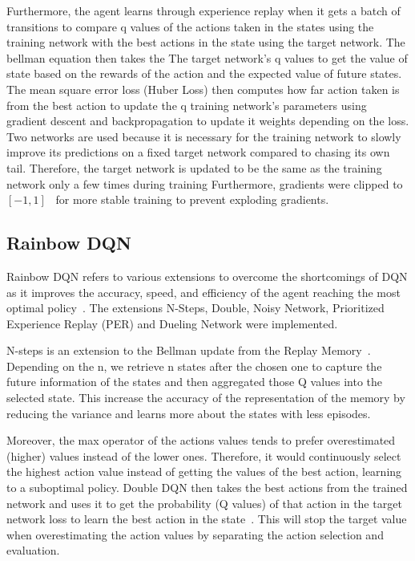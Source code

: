 \documentclass{article}
\begin{document}
Furthermore, the agent learns through experience replay when it gets a batch of transitions to compare q values of the actions taken in the states using the training network with the best actions in the state using the target network.
The bellman equation then takes the The target network's q values to get the value of state based on the rewards of the action and the expected value of future states.
The mean square error loss (Huber Loss) then computes how far action taken is from the best action to update the q training network's parameters using gradient descent and backpropagation to update it weights depending on the loss.
Two networks are used because it is necessary for the training network to slowly improve its predictions on a fixed target network compared to chasing its own tail.
Therefore, the target network is updated to be the same as the training network only a few times during training
Furthermore, gradients were clipped to \([-1,1]\)~\cite{mnih_human-level_2015} for more stable training to prevent exploding gradients.


\subsection{Rainbow DQN}

Rainbow DQN refers to various extensions to overcome the shortcomings of DQN as it improves the accuracy, speed, and efficiency of the agent reaching the most optimal policy~\cite{hessel_rainbow_2017}.
The extensions N-Steps, Double, Noisy Network, Prioritized Experience Replay (PER) and Dueling Network were implemented.

N-steps is an extension to the Bellman update from the Replay Memory~\cite{garcia_understanding_2019}.
Depending on the n, we retrieve n states after the chosen one to capture the future information of the states and then aggregated those Q values into the selected state.
This increase the accuracy of the representation of the memory by reducing the variance and learns more about the states with less episodes.

Moreover, the max operator of the actions values tends to prefer overestimated (higher) values instead of the lower ones.
Therefore, it would continuously select the highest action value instead of getting the values of the best action, learning to a suboptimal policy.
Double DQN then takes the best actions from the trained network and uses it to get the probability (Q values) of that action in the target network loss to learn the best action in the state~\cite{hasselt_deep_2015}.
This will stop the target value when overestimating the action values by separating the action selection and evaluation.
\end{document}
